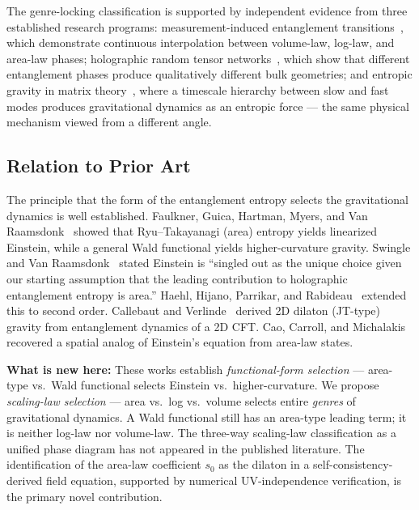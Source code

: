 \documentclass[aps,prd,twocolumn,superscriptaddress,nofootinbib,floatfix]{revtex4-2}
\newcommand{\sn}{s_0}
\begin{document}
The genre-locking classification is supported by independent evidence from three established research programs: measurement-induced entanglement transitions~\cite{LiChenFisher2018,GranetNahum2023}, which demonstrate continuous interpolation between volume-law, log-law, and area-law phases; holographic random tensor networks~\cite{VasseurPotterYouLudwig2019}, which show that different entanglement phases produce qualitatively different bulk geometries; and entropic gravity in matrix theory~\cite{Sahakian2025,AldamTajimaSahakian2026}, where a timescale hierarchy between slow and fast modes produces gravitational dynamics as an entropic force --- the same physical mechanism viewed from a different angle.

\subsection{Relation to Prior Art}

The principle that the form of the entanglement entropy selects the gravitational dynamics is well established. Faulkner, Guica, Hartman, Myers, and Van Raamsdonk~\cite{Faulkner2014} showed that Ryu--Takayanagi (area) entropy yields linearized Einstein, while a general Wald functional yields higher-curvature gravity. Swingle and Van Raamsdonk~\cite{Swingle2014} stated Einstein is ``singled out as the unique choice given our starting assumption that the leading contribution to holographic entanglement entropy is area.'' Haehl, Hijano, Parrikar, and Rabideau~\cite{Haehl2018} extended this to second order. Callebaut and Verlinde~\cite{CallebautVerlinde2018,Callebaut2019} derived 2D dilaton (JT-type) gravity from entanglement dynamics of a 2D CFT. Cao, Carroll, and Michalakis~\cite{CaoCarrollMichalakis2017,CaoCarroll2018} recovered a spatial analog of Einstein's equation from area-law states.

\textbf{What is new here:} These works establish \emph{functional-form selection} --- area-type vs.\ Wald functional selects Einstein vs.\ higher-curvature. We propose \emph{scaling-law selection} --- area vs.\ log vs.\ volume selects entire \emph{genres} of gravitational dynamics. A Wald functional still has an area-type leading term; it is neither log-law nor volume-law. The three-way scaling-law classification as a unified phase diagram has not appeared in the published literature. The identification of the area-law coefficient $\sn$ as the dilaton in a self-consistency-derived field equation, supported by numerical UV-independence verification, is the primary novel contribution.
\end{document}
